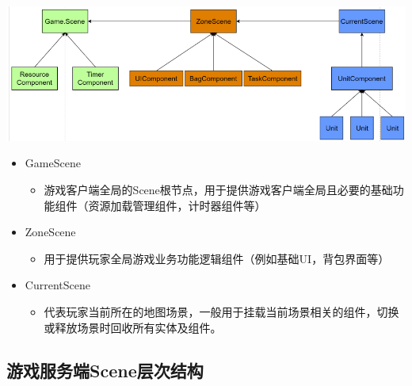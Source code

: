 \documentclass[9pt, b5paper]{article}
\begin{document}
\includegraphics[width=.9\linewidth]{./pic/readme_20230201_122307.png}
\begin{itemize}
\item GameScene
\begin{itemize}
\item 游戏客户端全局的Scene根节点，用于提供游戏客户端全局且必要的基础功能组件（资源加载管理组件，计时器组件等）
\end{itemize}
\item ZoneScene
\begin{itemize}
\item 用于提供玩家全局游戏业务功能逻辑组件（例如基础UI，背包界面等）
\end{itemize}
\item CurrentScene
\begin{itemize}
\item 代表玩家当前所在的地图场景，一般用于挂载当前场景相关的组件，切换或释放场景时回收所有实体及组件。
\end{itemize}
\end{itemize}
\subsection{游戏服务端Scene层次结构}
\label{sec-2-5}
\end{document}
